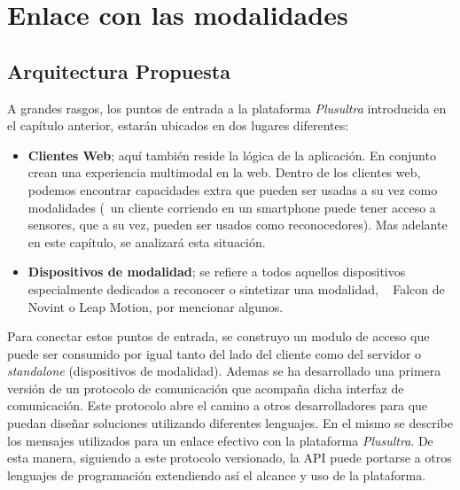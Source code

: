 
\chapter{Enlace con las modalidades} %

\label{ch:enlace} 



 
\section{Arquitectura Propuesta} \label{sec:enlace_overview}
A grandes rasgos, los puntos de entrada a la plataforma \emph{Plusultra} introducida en el capítulo anterior, estarán ubicados en dos lugares diferentes:

\begin{itemize}
\item \textbf{Clientes Web}; aquí también reside la lógica de la aplicación. En conjunto crean una experiencia multimodal en la web. Dentro de los clientes web, podemos encontrar capacidades extra que pueden ser usadas a su vez como modalidades (\ie ~un cliente corriendo en un smartphone puede tener acceso a sensores, que a su vez, pueden ser usados como reconocedores). Mas adelante en este capítulo, se analizará esta situación.
\item \textbf{Dispositivos de modalidad}; se refiere a todos aquellos dispositivos especialmente dedicados a reconocer o sintetizar una modalidad, \eg~ Falcon de Novint o Leap Motion, por mencionar algunos.
\end{itemize}

Para conectar estos puntos de entrada, se construyo un modulo de acceso que puede ser consumido por igual tanto del lado del cliente como del servidor o \emph{standalone} (dispositivos de modalidad). Ademas se ha desarrollado una primera versión de un protocolo de comunicación que acompaña dicha interfaz de comunicación. Este protocolo abre el camino a otros desarrolladores para que puedan diseñar soluciones utilizando diferentes lenguajes. 
En el mismo se describe los mensajes utilizados para un enlace efectivo con la plataforma \emph{Plusultra}. De esta manera, siguiendo a este protocolo versionado, la API puede portarse a otros lenguajes de programación extendiendo así el alcance y uso de la plataforma.

